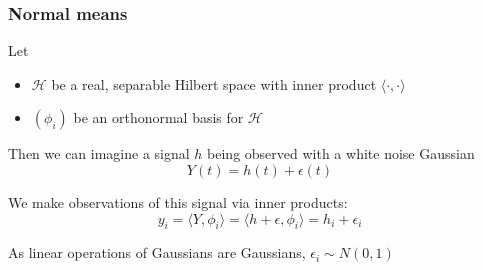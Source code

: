 \documentclass[12pt]{beamer}
\begin{document}
\begin{frame}
\frametitle{Normal means}
Let
\begin{itemize}
\item $\mathcal{H}$ be a real, separable Hilbert space with inner product $\langle \cdot, \cdot \rangle$
\item $(\phi_i)$ be an orthonormal basis for $\mathcal{H}$
\end{itemize}
Then we can imagine a signal $h$ being observed with a white noise Gaussian  
\[
Y(t) = h(t) + \epsilon(t)
\]
\vsp

We make observations of this signal via inner products:
\[
y_i = \langle Y , \phi_i\rangle = \langle h + \epsilon , \phi_i\rangle = h_i+ \epsilon_i
\]

\vsp
As linear operations of Gaussians are Gaussians, $\epsilon_i \sim N(0,1)$ 
\end{frame}

\end{document}
